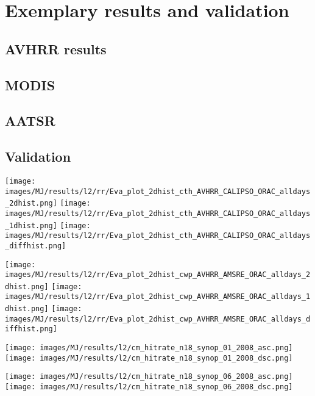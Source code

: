 \documentclass[amt]{style/copernicus}
\begin{document}
\section{Exemplary results and validation}\label{results}



\subsection{AVHRR results}
\subsection{MODIS}
\subsection{AATSR}

\subsection{Validation}

\begin{center}
\texttt{[image: images/MJ/results/l2/rr/Eva\_plot\_2dhist\_cth\_AVHRR\_CALIPSO\_ORAC\_alldays\_2dhist.png]}
\texttt{[image: images/MJ/results/l2/rr/Eva\_plot\_2dhist\_cth\_AVHRR\_CALIPSO\_ORAC\_alldays\_1dhist.png]}
\texttt{[image: images/MJ/results/l2/rr/Eva\_plot\_2dhist\_cth\_AVHRR\_CALIPSO\_ORAC\_alldays\_diffhist.png]}
\end{center}

\begin{center}
\texttt{[image: images/MJ/results/l2/rr/Eva\_plot\_2dhist\_cwp\_AVHRR\_AMSRE\_ORAC\_alldays\_2dhist.png]}
\texttt{[image: images/MJ/results/l2/rr/Eva\_plot\_2dhist\_cwp\_AVHRR\_AMSRE\_ORAC\_alldays\_1dhist.png]}
\texttt{[image: images/MJ/results/l2/rr/Eva\_plot\_2dhist\_cwp\_AVHRR\_AMSRE\_ORAC\_alldays\_diffhist.png]}
\end{center}


\begin{center}
\texttt{[image: images/MJ/results/l2/cm\_hitrate\_n18\_synop\_01\_2008\_asc.png]}
\texttt{[image: images/MJ/results/l2/cm\_hitrate\_n18\_synop\_01\_2008\_dsc.png]}
\end{center}

\begin{center}
\texttt{[image: images/MJ/results/l2/cm\_hitrate\_n18\_synop\_06\_2008\_asc.png]}
\texttt{[image: images/MJ/results/l2/cm\_hitrate\_n18\_synop\_06\_2008\_dsc.png]}
\end{center}
\end{document}
